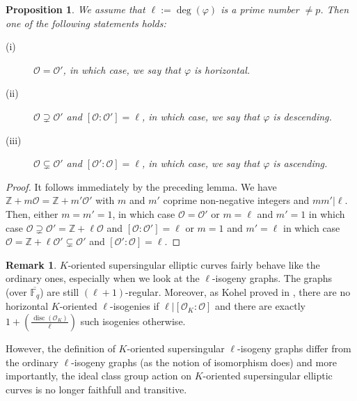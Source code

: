 \documentclass[a4paper,10pt]{report}
\theoremstyle{definition}
\theoremstyle{plain}
\newtheorem{proposition}[definition]{Proposition}
\theoremstyle{definition}
\newtheorem{remark}[definition]{Remark}
\newcommand{\Z}{\mathbb{Z}}
\newcommand{\F}{\mathbb{F}}
\newcommand{\mO}{\mathcal{O}}
\renewcommand{\(}{\left(}
\renewcommand{\)}{\right)}
\DeclareMathOperator{\disc}{disc}
\begin{document}
\begin{proposition}\label{proposition 4}
We assume that $\ell:=\deg(\varphi)$ is a prime number $\neq p$.  Then one of the following statements holds:
\begin{description}
\item[(i)] $\mO=\mO'$,  in which case,  we say that $\varphi$ is \emph{horizontal}.
\item[(ii)] $\mO\supsetneq \mO'$ and $[\mO:\mO']=\ell$,  in which case,  we say that $\varphi$ is \emph{descending}. 
\item[(iii)] $\mO\subsetneq \mO'$ and $[\mO':\mO]=\ell$,  in which case,  we say that $\varphi$ is \emph{ascending}. 
\end{description}
\end{proposition}

\begin{proof}
It follows immediately by the preceding lemma.  We have $\Z+m\mO=\Z+m'\mO'$ with $m$ and $m'$ coprime non-negative integers and $mm'|\ell$.  Then,  either $m=m'=1$,  in which case $\mO=\mO'$ or $m=\ell$ and $m'=1$  in which case $\mO\supsetneq \mO'=\Z+\ell\mO$ and $[\mO:\mO']=\ell$ or $m=1$ and $m'=\ell$  in which case $\mO=\Z+\ell\mO'\subsetneq \mO'$ and $[\mO':\mO]=\ell$.
\end{proof}

\begin{remark}
$K$-oriented supersingular elliptic curves fairly behave like the ordinary ones,  especially when we look at the $\ell$-isogeny graphs.  The graphs (over $\overline{\F_q}$) are still $(\ell+1)$-regular.  Moreover,  as Kohel proved in \cite[proposition 23]{Kohel_thesis},  there are no horizontal $K$-oriented $\ell$-isogenies if $\ell|[\mO_K:\mO]$ and there are exactly $1+\(\frac{\disc(\mO_K)}{\ell}\)$ such isogenies otherwise.

However,  the definition of $K$-oriented supersingular $\ell$-isogeny graphs differ from the ordinary $\ell$-isogeny graphs  (as the notion of isomorphism does) and more importantly,  the ideal class group action on $K$-oriented supersingular elliptic curves is no longer faithfull and transitive.
\end{remark}
\end{document}
